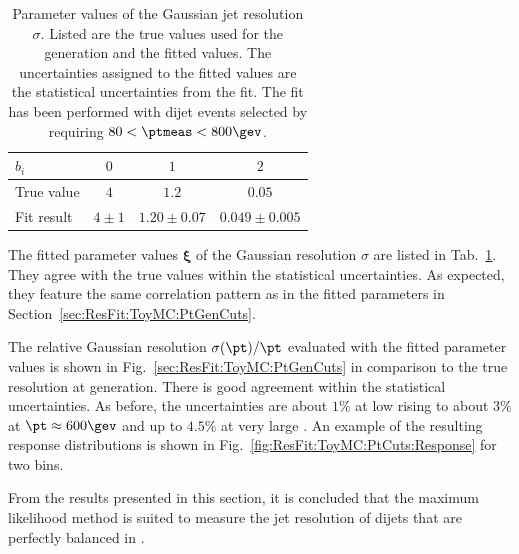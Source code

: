 \begin{table}[ht]
  \caption{Parameter values of the Gaussian jet \pt resolution
    $\sigma$.
    Listed are the true values used for the generation and
    the fitted values.
    The uncertainties assigned to the fitted values
    are the statistical uncertainties from the fit.
    The fit has been performed with dijet events selected by requiring \mbox{$80 < \ptmeas < 800\gev$}.}
  \begin{center}
    \begin{tabular}[ht]{lccc}
      \toprule
      $b_{i}$ & $0$ & $1$ & $2$ \\
      \midrule
      True value & $4$           & $1.2$                   & $0.05$ \\
      Fit result   & $4 \pm 1$ & $1.20 \pm 0.07$ & $0.049 \pm 0.005$ \\
      \bottomrule
   \end{tabular}
  \end{center}
 \label{tab:ResFit:ToyMC:PtCuts:FitResult}
\end{table}


The fitted parameter values $\mathbf{\xi}$ of the Gaussian resolution $\sigma$ are listed in Tab.~\ref{tab:ResFit:ToyMC:PtCuts:FitResult}.
They agree with the true values within the statistical uncertainties.
As expected, they feature the same correlation pattern as in the
fitted parameters in Section~\ref{sec:ResFit:ToyMC:PtGenCuts}.

The relative Gaussian resolution $\sigma(\pt)/\pt$ evaluated with the fitted parameter values is shown in Fig.~\ref{sec:ResFit:ToyMC:PtGenCuts} in comparison to the true resolution at generation.
There is good agreement within the statistical uncertainties.
As before, the uncertainties are about $1\%$ at low \pt rising to about $3\%$ at $\pt \approx 600\gev$ and up to $4.5\%$ at very large \pt.
An example of the resulting response distributions is shown in
Fig.~\ref{fig:ResFit:ToyMC:PtCuts:Response} for two \pttrue bins.

From the results presented in this section, it is concluded that the
maximum likelihood method is suited to measure the jet \pt resolution
of dijets that are perfectly balanced in \pttrue.
